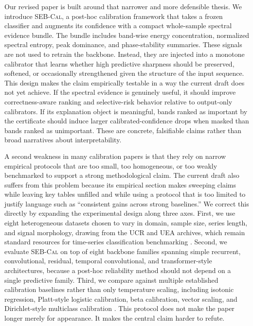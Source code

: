 \documentclass{article}
\newcommand{\method}{\textsc{SEB-Cal}}
\begin{document}
Our revised paper is built around that narrower and more defensible thesis. We introduce \method{}, a post-hoc calibration framework that takes a frozen classifier and augments its confidence with a compact whole-sample spectral evidence bundle. The bundle includes band-wise energy concentration, normalized spectral entropy, peak dominance, and phase-stability summaries. These signals are not used to retrain the backbone. Instead, they are injected into a monotone calibrator that learns whether high predictive sharpness should be preserved, softened, or occasionally strengthened given the structure of the input sequence. This design makes the claim empirically testable in a way the current draft does not yet achieve. If the spectral evidence is genuinely useful, it should improve correctness-aware ranking and selective-risk behavior relative to output-only calibrators. If its explanation object is meaningful, bands ranked as important by the certificate should induce larger calibrated-confidence drops when masked than bands ranked as unimportant. These are concrete, falsifiable claims rather than broad narratives about interpretability.

A second weakness in many calibration papers is that they rely on narrow empirical protocols that are too small, too homogeneous, or too weakly benchmarked to support a strong methodological claim. The current draft also suffers from this problem because its empirical section makes sweeping claims while leaving key tables unfilled and while using a protocol that is too limited to justify language such as “consistent gains across strong baselines.” We correct this directly by expanding the experimental design along three axes. First, we use eight heterogeneous datasets chosen to vary in domain, sample size, series length, and signal morphology, drawing from the UCR and UEA archives, which remain standard resources for time-series classification benchmarking \cite{dau2019ucr,bagnall2018uea}. Second, we evaluate \method{} on top of eight backbone families spanning simple recurrent, convolutional, residual, temporal convolutional, and transformer-style architectures, because a post-hoc reliability method should not depend on a single predictive family. Third, we compare against multiple established calibration baselines rather than only temperature scaling, including isotonic regression, Platt-style logistic calibration, beta calibration, vector scaling, and Dirichlet-style multiclass calibration \cite{kull2017beta,kull2019dirichlet}. This protocol does not make the paper longer merely for appearance. It makes the central claim harder to refute.
\end{document}
